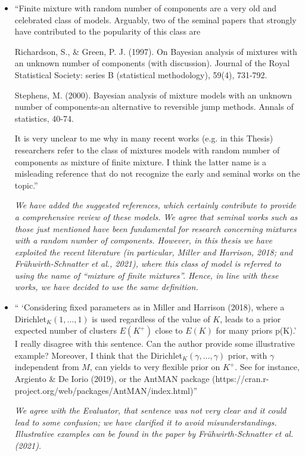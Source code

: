 \documentclass[11pt]{letter}
\begin{document}
\begin{itemize}
%
\item ``Finite mixture with random number of components are a very old and celebrated class of models. Arguably, two of the seminal papers that strongly have contributed to the popularity of this class are

Richardson, S., \& Green, P. J. (1997). On Bayesian analysis of mixtures with an unknown number of components (with discussion). Journal of the Royal Statistical Society: series B (statistical methodology), 59(4), 731-792.

Stephens, M. (2000). Bayesian analysis of mixture models with an unknown number of components-an
alternative to reversible jump methods. Annals of statistics, 40-74.

It is very unclear to me why in many recent works (e.g. in this Thesis) researchers refer to the class of mixtures models with random number of components as mixture of finite mixture. I think the latter name is a misleading reference that do not recognize the early and seminal works on the topic.''\vskip1mm

{\em 
	We have added the suggested references, which certainly contribute to provide a comprehensive review of these models.
	We agree that seminal works such as those just mentioned have been fundamental for research concerning mixtures with a random number of components. However, in this thesis we have exploited the recent literature (in particular, Miller and Harrison, 2018; and Fr\"uhwirth-Schnatter et al., 2021), where this class of model is referred to using the name of ``mixture of finite mixtures''. Hence, in line with these works, we have decided to use the same definition.
}
\vskip3mm

%
\item `` `Considering fixed parameters as in Miller and Harrison (2018), where a Dirichlet$_K(1,\dots, 1)$ is used regardless of the value of $K$, leads to a prior expected number of clusters $E(K^+)$ close to $E(K)$ for many priors p(K).'\\
I really disagree with this sentence. Can the author provide some illustrative example? Moreover, I think that the Dirichlet$_K(\gamma,\dots, \gamma)$ prior, with $\gamma$ independent from $M$, can yields to very flexible prior on $K^+$. See for instance, Argiento \& De Iorio (2019), or the AntMAN package (https://cran.r-
project.org/web/packages/AntMAN/index.html)''\vskip1mm

{\em 
	We agree with the Evaluator, that sentence was not very clear and it could lead to some confusion; we have clarified it to avoid misunderstandings. Illustrative examples can be found in the paper by Fr\"uhwirth-Schnatter et al. (2021).
}
\vskip3mm


\end{itemize}
\end{document}
